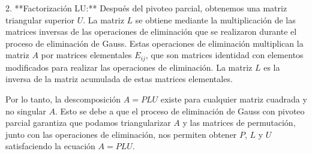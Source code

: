 \documentclass[a4paper,12pt]{article}
\begin{document}
2. **Factorización LU:**
   Después del pivoteo parcial, obtenemos una matriz triangular superior \( U \). La matriz \( L \) se obtiene mediante la multiplicación de las matrices inversas de las operaciones de eliminación que se realizaron durante el proceso de eliminación de Gauss. Estas operaciones de eliminación multiplican la matriz \( A \) por matrices elementales \( E_{ij} \), que son matrices identidad con elementos modificados para realizar las operaciones de eliminación. La matriz \( L \) es la inversa de la matriz acumulada de estas matrices elementales.

Por lo tanto, la descomposición \( A = PLU \) existe para cualquier matriz cuadrada y no singular \( A \). Esto se debe a que el proceso de eliminación de Gauss con pivoteo parcial garantiza que podamos triangularizar \( A \) y las matrices de permutación, junto con las operaciones de eliminación, nos permiten obtener \( P \), \( L \) y \( U \) satisfaciendo la ecuación \( A = PLU \).

\end{document}
